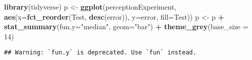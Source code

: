\documentclass[
]{article}
\newenvironment{Shaded}{\begin{snugshade}}{\end{snugshade}}
\newcommand{\DataTypeTok}[1]{\textcolor[rgb]{0.13,0.29,0.53}{#1}}
\newcommand{\DecValTok}[1]{\textcolor[rgb]{0.00,0.00,0.81}{#1}}
\newcommand{\KeywordTok}[1]{\textcolor[rgb]{0.13,0.29,0.53}{\textbf{#1}}}
\newcommand{\NormalTok}[1]{#1}
\newcommand{\OperatorTok}[1]{\textcolor[rgb]{0.81,0.36,0.00}{\textbf{#1}}}
\newcommand{\StringTok}[1]{\textcolor[rgb]{0.31,0.60,0.02}{#1}}
\begin{document}
\begin{Shaded}
\begin{Highlighting}[]
\KeywordTok{library}\NormalTok{(tidyverse)}
\NormalTok{p <-}\StringTok{ }\KeywordTok{ggplot}\NormalTok{(perceptionExperiment, }\KeywordTok{aes}\NormalTok{(}\DataTypeTok{x=}\KeywordTok{fct_reorder}\NormalTok{(Test, }\KeywordTok{desc}\NormalTok{(error)), }\DataTypeTok{y=}\NormalTok{error, }\DataTypeTok{fill=}\NormalTok{Test))}
\NormalTok{p <-}\StringTok{ }\NormalTok{p }\OperatorTok{+}\StringTok{ }\KeywordTok{stat_summary}\NormalTok{(}\DataTypeTok{fun.y=}\StringTok{"median"}\NormalTok{, }\DataTypeTok{geom=}\StringTok{"bar"}\NormalTok{) }\OperatorTok{+}\StringTok{ }\KeywordTok{theme_grey}\NormalTok{(}\DataTypeTok{base_size =} \DecValTok{14}\NormalTok{)}
\end{Highlighting}
\end{Shaded}

\begin{verbatim}
## Warning: `fun.y` is deprecated. Use `fun` instead.
\end{verbatim}
\end{document}
